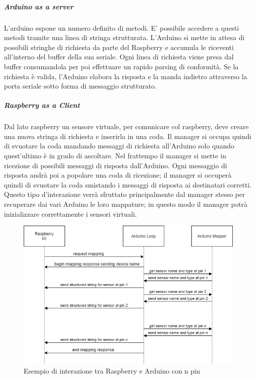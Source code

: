 \documentclass[12pt]{article}
\begin{document}
\subparagraph{Arduino as a server}
L'arduino espone un numero definito di metodi. E' possibile accedere a questi metodi tramite una linea di stringa strutturata. L'Arduino si mette in attesa di possibili stringhe di richiesta da parte del Raspberry e accumula le riceventi all'interno del buffer della sua seriale.
Ogni linea di richiesta viene presa dal buffer consumandola per poi effettuare un rapido parsing di conformità. Se la richiesta è valida, l'Arduino elabora la risposta e la manda indietro attraverso la porta seriale sotto forma di messaggio strutturato.
\subparagraph{Raspberry as a Client}
Dal lato raspberry un sensore virtuale, per comunicare col raspberry, deve creare una nuova stringa di richiesta e inserirla in una coda. 
Il manager si occupa quindi di svuotare la coda mandando messaggi di richiesta all'Arduino solo quando quest'ultimo è in grado di ascoltare. Nel frattempo il manager si mette in ricezione di possibili messaggi di risposta dall'Arduino. Ogni messaggio di risposta andrà poi a popolare una coda di ricezione; il manager si occuperà quindi di svuotare la coda smistando i messaggi di risposta ai destinatari corretti.
Questo tipo d'interazione verrà sfruttato principalmente dal manager stesso per recuperare dai vari Arduino le loro mappature; in questo modo il manager potrà inizializzare correttamente i sensori virtuali.
\begin{figure}[h!]
\centering
	\includegraphics[scale=0.75]{img/parteLocale/RaspArduInterationDiagram.png}  
    \caption{Esempio di interazione tra Raspberry e Arduino con n pin}
\end{figure}
\newpage
\end{document}
